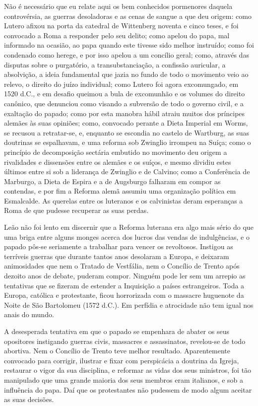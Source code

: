\documentclass[11pt,a5paper,twoside,openany]{book}
\begin{document}
Não é necessário que eu relate aqui os bem conhecidos pormenores daquela controvérsia, as guerras desoladoras e as cenas de sangue a que deu origem: como Lutero afixou na porta da catedral de Wittenberg noventa e cinco teses, e foi convocado a Roma a responder pelo seu delito; como apelou do papa, mal informado na ocasião, ao papa quando este tivesse sido melhor instruído; como foi condenado como herege, e por isso apelou a um concílio geral; como, através das disputas sobre o purgatório, a transubstanciação, a confissão auricular, a absolvição, a ideia fundamental que jazia no fundo de todo o movimento veio ao relevo, o direito do juízo individual; como Lutero foi agora excomungado, em 1520 d.C., e em desafio queimou a bula de excomunhão e os volumes do direito canônico, que denunciou como visando a subversão de todo o governo civil, e a exaltação do papado; como por esta manobra hábil atraiu muitos dos príncipes alemães às suas opiniões; como, convocado perante a Dieta Imperial em Worms, se recusou a retratar-se, e, enquanto se escondia no castelo de Wartburg, as suas doutrinas se espalhavam, e uma reforma sob Zwinglio irrompeu na Suíça; como o princípio de decomposição sectária embutido no movimento deu origem a rivalidades e dissensões entre os alemães e os suíços, e mesmo dividiu estes últimos entre si sob a liderança de Zwinglio e de Calvino; como a Conferência de Marburgo, a Dieta de Espira e a de Augsburgo falharam em compor as contendas, e por fim a Reforma alemã assumiu uma organização política em Esmalcalde. As querelas entre os luteranos e os calvinistas deram esperanças a Roma de que pudesse recuperar as suas perdas.

Leão não foi lento em discernir que a Reforma luterana era algo mais sério do que uma briga entre alguns monges acerca dos lucros das vendas de indulgências, e o papado pôs-se seriamente a trabalhar para vencer os revoltosos. Instigou as terríveis guerras que durante tantos anos desolaram a Europa, e deixaram animosidades que nem o Tratado de Vestfália, nem o Concílio de Trento após dezoito anos de debate, puderam compor. Ninguém pode ler sem um arrepio as tentativas que se fizeram de estender a Inquisição a países estrangeiros. Toda a Europa, católica e protestante, ficou horrorizada com o massacre huguenote da Noite de São Bartolomeu (1572 d.C.). Em perfídia e atrocidade não tem igual nos anais do mundo.

A desesperada tentativa em que o papado se empenhara de abater os seus opositores instigando guerras civis, massacres e assassinatos, revelou-se de todo abortiva. Nem o Concílio de Trento teve melhor resultado. Aparentemente convocado para corrigir, ilustrar e fixar com perspicácia a doutrina da Igreja, restaurar o vigor da sua disciplina, e reformar as vidas dos seus ministros, foi tão manipulado que uma grande maioria dos seus membros eram italianos, e sob a influência do papa. Daí que os protestantes não pudessem de modo algum aceitar as suas decisões.
\end{document}
